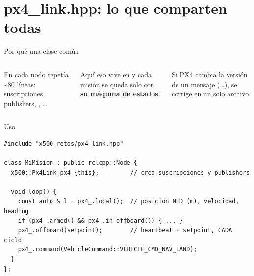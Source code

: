 \section{px4\_link.hpp: lo que comparten todas}

\begin{frame}{Por qué una clase común}
  \begin{columns}[c]
    \small
    En  cada nodo repetía \textasciitilde80 líneas:
    suscripciones, publishers, , \ldots
    \vspace{0.4em}

    Aquí eso vive en  y cada misión se queda solo con
    \textbf{su máquina de estados}.
    \vspace{0.4em}
    \begin{idea}
      \small Si PX4 cambia la versión de un mensaje (\ldots),
      se corrige en un solo archivo.
    \end{idea}
  \end{columns}
\end{frame}

\begin{frame}[fragile]{Uso}
  \begin{lstlisting}[style=cpp,caption={Dentro de cualquier rclcpp::Node}]
#include "x500_retos/px4_link.hpp"

class MiMision : public rclcpp::Node {
  x500::Px4Link px4_{this};         // crea suscripciones y publishers

  void loop() {
    const auto & l = px4_.local();  // posición NED (m), velocidad, heading
    if (px4_.armed() && px4_.in_offboard()) { ... }
    px4_.offboard(setpoint);        // heartbeat + setpoint, CADA ciclo
    px4_.command(VehicleCommand::VEHICLE_CMD_NAV_LAND);
  }
};
  \end{lstlisting}
\end{frame}

